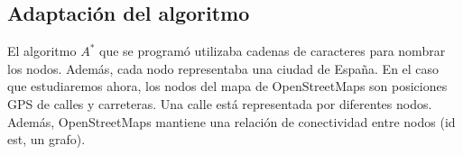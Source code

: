 \documentclass{article}
\begin{document}


\subsection{Adaptación del algoritmo}
El algoritmo $A^*$ que se programó utilizaba cadenas de caracteres para nombrar los nodos. Además, cada nodo representaba una ciudad de España. En el caso que estudiaremos ahora, los nodos del mapa de OpenStreetMaps son posiciones GPS de calles y carreteras. Una calle está representada por diferentes nodos. Además, OpenStreetMaps mantiene una relación de conectividad entre nodos (id est, un grafo).
\end{document}
